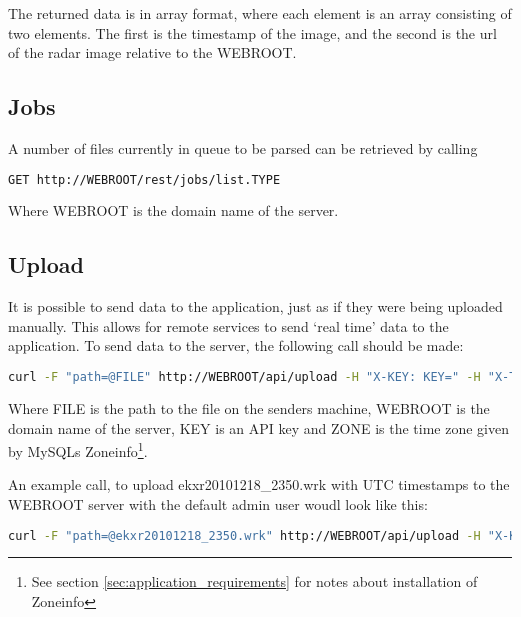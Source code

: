 The returned data is in array format, where each element is an array consisting of two elements. The first is the timestamp of the image, and the second is the url of the radar image relative to the \textsf{WEBROOT}.

\subsection{Jobs}
\label{sec:api_jobs}
A number of files currently in queue to be parsed can be retrieved by calling
\begin{lstlisting}[language=sh,caption={Url for retrieving the number of files queued for process}]
GET http://WEBROOT/rest/jobs/list.TYPE
\end{lstlisting}
Where \textsf{WEBROOT} is the domain name of the server.

\subsection{Upload}
\label{sec:api_upload}
It is possible to send data to the application, just as if they were being uploaded manually. This allows for remote services to send `real time' data to the application. To send data to the server, the following call should be made:
\begin{lstlisting}[language=sh,caption={cURL call to send file}]
curl -F "path=@FILE" http://WEBROOT/api/upload -H "X-KEY: KEY=" -H "X-TIMEZONE: ZONE" -X POST
\end{lstlisting}
Where \textsf{FILE} is the path to the file on the senders machine, \textsf{WEBROOT} is the domain name of the server, \textsf{KEY} is an API key and \textsf{ZONE} is the time zone given by MySQLs Zoneinfo\footnote{See section \ref{sec:application_requirements} for notes about installation of Zoneinfo}.

An example call, to upload \textsf{ekxr20101218\_2350.wrk} with UTC timestamps to the \textsf{WEBROOT} server with the default admin user woudl look like this:
\begin{lstlisting}[language=sh,caption={Example cURL call to send a file}]
curl -F "path=@ekxr20101218_2350.wrk" http://WEBROOT/api/upload -H "X-KEY: YWqmPGH+dOEvOh6pf83a62lzJ1QQLHRMPHhNIaohB3s=" -H "X-TIMEZONE: UTC" -X POST
\end{lstlisting}